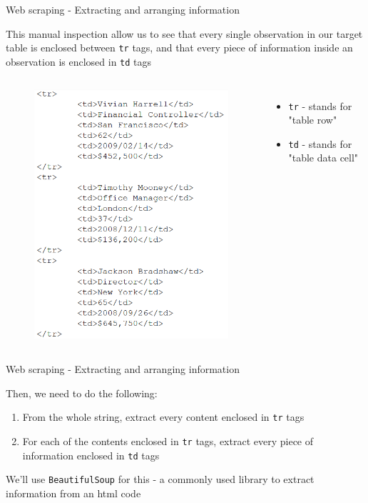 \documentclass[aspectratio=169]{beamer}
\begin{document}
\begin{frame}{Web scraping - Extracting and arranging information}

	This manual inspection allow us to see that every single observation in our target table is enclosed between \texttt{tr} tags, and that every piece of information inside an observation is enclosed in \texttt{td} tags
	
	\begin{columns}[c]

		\begin{figure}
			\centering
			\includegraphics[width=0.6\linewidth]{img/tags2.png}
		\end{figure}
		
		\begin{itemize}
			\item \texttt{tr} - stands for "table row"
			\item \texttt{td} - stands for "table data cell"
		\end{itemize}
		
	\end{columns}


\end{frame}

\begin{frame}{Web scraping - Extracting and arranging information}

	Then, we need to do the following:

	\begin{enumerate}
		\item From the whole string, extract every content enclosed in \texttt{tr} tags
		\item For each of the contents enclosed in \texttt{tr} tags, extract every piece of information enclosed in \texttt{td} tags
	\end{enumerate}

	We'll use \texttt{BeautifulSoup} for this 
	- a commonly used library to extract information from an html code

\end{frame}
\end{document}
